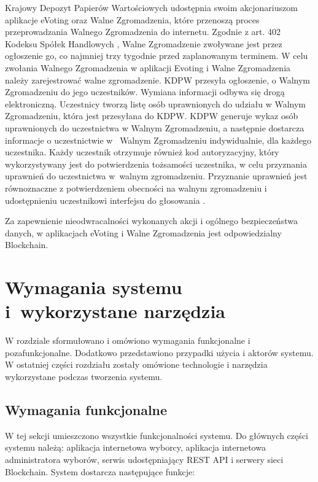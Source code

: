 \documentclass[a4paper,12pt]{book}
\begin{document}
Krajowy Depozyt Papierów Wartościowych udostępnia swoim akcjonariuszom aplikacje eVoting oraz Walne Zgromadzenia, które przenoszą proces przeprowadzania Walnego Zgromadzenia do internetu. Zgodnie z art. 402 Kodeksu Spółek Handlowych \cite{sp-han}, Walne Zgromadzenie zwoływane jest przez ogłoszenie go, co najmniej trzy tygodnie przed zaplanowanym terminem. W celu zwołania Walnego Zgromadzenia w aplikacji Evoting i Walne Zgromadzenia należy zarejestrować walne zgromadzenie. KDPW przesyła ogłoszenie, o Walnym Zgromadzeniu do jego uczestników. Wymiana informacji odbywa się drogą elektroniczną.
Uczestnicy tworzą listę osób uprawnionych do udziału w Walnym Zgromadzeniu, która jest przesyłana do KDPW. KDPW generuje wykaz osób uprawnionych do uczestnictwa w Walnym Zgromadzeniu, a następnie dostarcza informacje o uczestnictwie w~ Walnym Zgromadzeniu indywidualnie, dla każdego uczestnika. Każdy uczestnik otrzymuje również kod autoryzacyjny, który wykorzystywany jest do potwierdzenia tożsamości uczestnika, w celu przyznania uprawnień do uczestnictwa w~walnym zgromadzeniu. Przyznanie uprawnień jest równoznaczne z potwierdzeniem obecności na walnym zgromadzeniu i udostępnieniu uczestnikowi interfejsu do głosowania \cite{eVoting-dzialanie}.

Za zapewnienie nieodwracalności wykonanych akcji i ogólnego bezpieczeństwa danych, w aplikacjach eVoting i Walne Zgromadzenia jest odpowiedzialny Blockchain.

\chapter{Wymagania systemu i~wykorzystane narzędzia}
W rozdziale sformułowano i omówiono wymagania funkcjonalne i pozafunkcjonalne. Dodatkowo przedstawiono przypadki użycia i aktorów systemu. W ostatniej części rozdziału zostały omówione technologie i narzędzia wykorzystane podczas tworzenia systemu.

\section {Wymagania funkcjonalne}

W tej sekcji umieszczono wszystkie funkcjonalności systemu. Do głównych części systemu należą: aplikacja internetowa wyborcy, aplikacja internetowa administratora wyborów, serwis udostępniający REST API i serwery sieci Blockchain. System dostarcza następujące funkcje:
\end{document}
